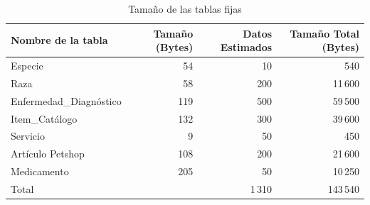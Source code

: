 \begin{table}[H]
\centering
\footnotesize
\begin{tabular}{lrrr}
\toprule
\textbf{Nombre de la tabla} & \textbf{Tamaño (Bytes)} & \textbf{Datos Estimados} & \textbf{Tamaño Total (Bytes)} \\
\midrule
Especie & 54 & 10 & 540 \\
Raza & 58 & 200 & 11\,600 \\
Enfermedad\_Diagnóstico & 119 & 500 & 59\,500 \\
Item\_Catálogo & 132 & 300 & 39\,600 \\
Servicio & 9 & 50 & 450 \\
Artículo Petshop & 108 & 200 & 21\,600 \\
Medicamento & 205 & 50 & 10\,250 \\
\midrule
Total & & 1\,310 & 143\,540 \\
\bottomrule
\end{tabular}
\caption{Tamaño de las tablas fijas}
\end{table}

